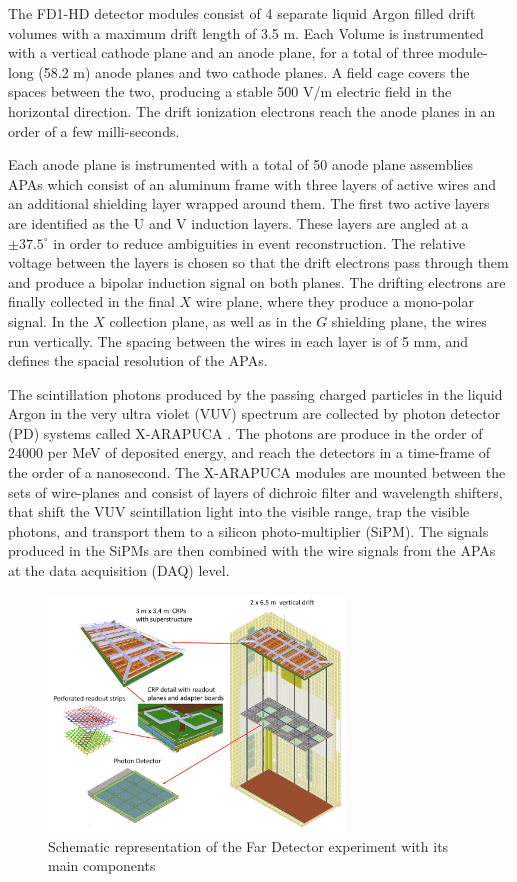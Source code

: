 The FD1-HD detector modules consist of 4 separate liquid Argon filled drift volumes with a maximum drift length of 3.5 m. Each Volume is instrumented with a vertical cathode plane and an anode plane, for a total of three module-long (58.2 m) anode planes and two cathode planes. A field cage covers the spaces between the two, producing a stable 500 V/m electric field in the horizontal direction. The drift ionization electrons reach the anode planes in an order of a few milli-seconds. 

Each anode plane is instrumented with a total of 50 anode plane assemblies APAs which consist of an aluminum frame with three layers of active wires and an additional shielding layer wrapped around them. The first two active layers are identified as the U and V induction layers. These layers are angled at a $\pm 37.5^\circ$ in order to reduce ambiguities in event reconstruction. The relative voltage between the layers is chosen so that the drift electrons pass through them and produce a bipolar induction signal on both planes. The drifting electrons are finally collected in the final $X$ wire plane, where they produce a mono-polar signal. In the $X$ collection plane, as well as in the $G$ shielding plane, the wires run vertically. The spacing between the wires in each layer is of 5 mm, and defines the spacial resolution of the APAs.

The scintillation photons produced by the passing charged particles in the liquid Argon in the very ultra violet (VUV) spectrum are collected by photon detector (PD) systems called X-ARAPUCA \cite{Segreto:2018jdx}. The photons are produce in the order of 24000 per MeV of deposited energy, and reach the detectors in a time-frame of the order of a nanosecond. The X-ARAPUCA modules are mounted between the sets of wire-planes and consist of layers of dichroic filter and wavelength shifters, that shift the VUV scintillation light into the visible range, trap the visible photons, and transport them to a silicon photo-multiplier (SiPM). The signals produced in the SiPMs are then combined with the wire signals from the APAs at the data acquisition (DAQ) level.

\begin{figure}[!t]
     \centering
     \includegraphics[width=0.7\textwidth]{figures/ch3-DUNE/setup_new_updated.png}
     \caption{Schematic representation of the Far Detector experiment with its main components}
        \label{fig:FDLArTPCModule}
\end{figure}

